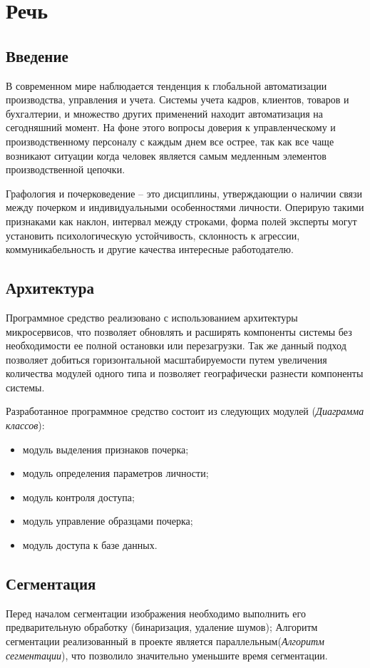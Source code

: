 \section{Речь}
\subsection{Введение}
В современном мире наблюдается тенденция к глобальной автоматизации производства, управления и учета. Системы учета кадров, клиентов, товаров и бухгалтерии, и множество других применений находит автоматизация на сегодняшний момент.
На фоне этого вопросы доверия к управленческому и производственному персоналу с каждым днем все острее, так как все чаще возникают ситуации когда человек является самым медленным элементов производственной цепочки.

Графология и почерковедение – это дисциплины, утверждающии о наличии связи между почерком и индивидуальными особенностями личности. Оперирую такими признаками как наклон, интервал между строками, форма полей эксперты могут установить психологическую устойчивость, склонность к агрессии, коммуникабельность и другие качества интересные работодателю.

\subsection{Архитектура}
Программное средство реализовано с использованием архитектуры микросервисов, что позволяет обновлять и расширять компоненты системы без необходимости ее полной остановки или перезагрузки. Так же данный подход позволяет добиться горизонтальной масштабируемости путем увеличения количества модулей одного типа и позволяет географически разнести компоненты системы. 

Разработанное программное средство состоит из следующих модулей (\emph{Диаграмма классов}):
\begin{itemize}
    \item модуль выделения признаков почерка;
    \item модуль определения параметров личности;
    \item модуль контроля доступа;
    \item модуль управление образцами почерка;
    \item модуль доступа к базе данных.
\end{itemize}

\subsection{Сегментация}
Перед началом сегментации изображения необходимо выполнить его предварительную обработку (бинаризация, удаление шумов);
Алгоритм сегментации реализованный в проекте является параллельным(\emph{Алгоритм сегментации}), что позволило значительно уменьшите время сегментации. 

